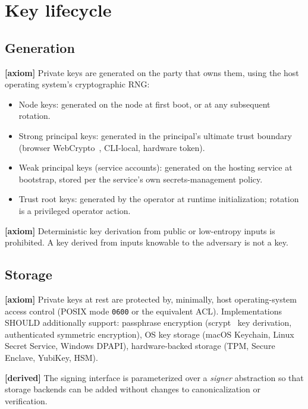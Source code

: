 \documentclass[11pt,a4paper]{article}
\newcommand{\axiom}{\textcolor{axiomcolor}{\textbf{[axiom]}}\xspace}
\newcommand{\derived}{\textcolor{derivedcolor}{\textbf{[derived]}}\xspace}
\begin{document}
\section{Key lifecycle}
\label{sec:keys}

\subsection{Generation}

\axiom{} Private keys are generated on the party that owns them, using
the host operating system's cryptographic RNG:

\begin{itemize}[leftmargin=2em,itemsep=0.15em]
    \item Node keys: generated on the node at first boot, or at any
    subsequent rotation.
    \item Strong principal keys: generated in the principal's
    ultimate trust boundary (browser WebCrypto~\cite{webcrypto},
    CLI-local, hardware token).
    \item Weak principal keys (service accounts): generated on the
    hosting service at bootstrap, stored per the service's own
    secrets-management policy.
    \item Trust root keys: generated by the operator at runtime
    initialization; rotation is a privileged operator action.
\end{itemize}

\axiom{} Deterministic key derivation from public or low-entropy inputs
is prohibited. A key derived from inputs knowable to the adversary is
not a key.

\subsection{Storage}

\axiom{} Private keys at rest are protected by, minimally, host
operating-system access control (POSIX mode \texttt{0600} or the
equivalent ACL). Implementations SHOULD additionally support:
passphrase encryption (scrypt~\cite{rfc7914} key derivation, authenticated
symmetric encryption), OS key storage (macOS Keychain, Linux Secret
Service, Windows DPAPI), hardware-backed storage (TPM, Secure Enclave,
YubiKey, HSM).

\derived{} The signing interface is parameterized over a
\emph{signer} abstraction so that storage backends can be added
without changes to canonicalization or verification.
\end{document}
